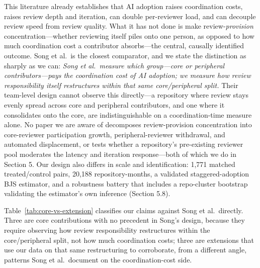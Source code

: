 \documentclass[12pt]{article}
\begin{document}
This literature already establishes that AI adoption raises coordination
costs, raises review depth and iteration, can double per-reviewer load,
and can decouple review speed from review quality. What it has not done
is make review-\emph{provision} concentration---whether reviewing itself
piles onto one person, as opposed to how much coordination cost a
contributor absorbs---the central, causally identified outcome. Song et
al.\ is the closest comparator, and we state the distinction as sharply
as we can: \emph{Song et al.\ measure which group---core or peripheral
contributors---pays the coordination cost of AI adoption; we measure how
review responsibility itself restructures within that same
core/peripheral split.} Their team-level design cannot observe this
directly---a repository where review stays evenly spread across core and
peripheral contributors, and one where it consolidates onto the core,
are indistinguishable on a coordination-time measure alone. No paper we
are aware of decomposes review-provision concentration into
core-reviewer participation growth, peripheral-reviewer withdrawal, and
automated displacement, or tests whether a repository's pre-existing
reviewer pool moderates the latency and iteration response---both of
which we do in Section 5. Our design also differs in scale and
identification: 1,771 matched treated/control pairs, 20,188
repository-months, a validated staggered-adoption BJS estimator, and a
robustness battery that includes a repo-cluster bootstrap validating the
estimator's own inference (Section 5.8).

Table~\ref{tab:core-vs-extension} classifies our claims against Song et
al.\ directly. Three are core contributions with no precedent in Song's
design, because they require observing how review responsibility
restructures within the core/peripheral split, not how much coordination
costs; three are extensions that use our data on that same restructuring
to corroborate, from a different angle, patterns Song et al.\ document on
the coordination-cost side.
\end{document}
